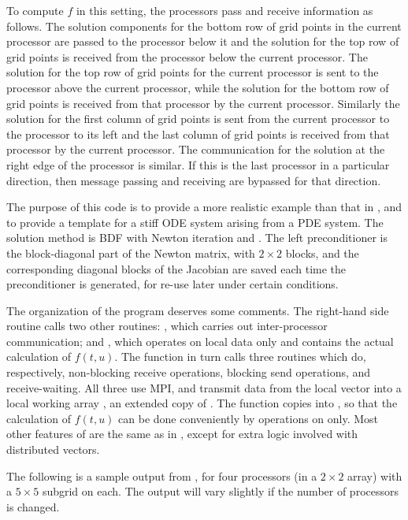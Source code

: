 To compute $f$ in this setting, the processors pass and receive
information as follows.  The solution components for the bottom row of
grid points in the current processor are passed to the processor below
it and the solution for the top row of grid points is received from
the processor below the current processor. The solution for the top
row of grid points for the current processor is sent to the processor
above the current processor, while the solution for the bottom row of
grid points is received from that processor by the current
processor. Similarly the solution for the first column of grid points
is sent from the current processor to the processor to its left and
the last column of grid points is received from that processor by the
current processor. The communication for the solution at the right
edge of the processor is similar. If this is the last processor in a
particular direction, then message passing and receiving are bypassed
for that direction.

The purpose of this code is to provide a more realistic example than
that in , and to provide a template for a stiff ODE system
arising from a PDE system. The solution method is BDF with Newton
iteration and {\spgmr}. The left preconditioner is the block-diagonal
part of the Newton matrix, with $2 \times 2$ blocks, and the
corresponding diagonal blocks of the Jacobian are saved each time the
preconditioner is generated, for re-use later under certain conditions.

The organization of the  program deserves some comments. The
right-hand side routine  calls two other routines: , which
carries out inter-processor communication; and , which operates on
local data only and contains the actual calculation of $f(t,u)$. The 
 function in turn calls three routines which do, respectively,
non-blocking receive operations, blocking send operations, and
receive-waiting. All three use MPI, and transmit data from the local 
vector into a local working array , an extended copy of .
The  function copies  into , so that the
calculation of $f(t,u)$ can be done conveniently by operations on 
 only.  Most other features of  are the same as
in , except for extra logic involved with distributed
vectors.

The following is a sample output from , for four processors
(in a $2 \times 2$ array) with a $5 \times 5$ subgrid on each.
The output will vary slightly if the number of processors is changed.

